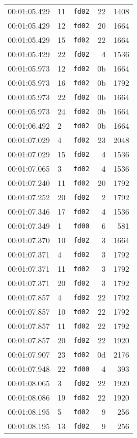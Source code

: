 \documentclass{article}
\begin{document}
\begin{longtable}{lllrr}
00:01:05.429 & 11 & \texttt{fd02} & 22 & 1408 \\
00:01:05.429 & 12 & \texttt{fd02} & 20 & 1664 \\
00:01:05.429 & 15 & \texttt{fd02} & 22 & 1664 \\
00:01:05.429 & 22 & \texttt{fd02} & 4 & 1536 \\
00:01:05.973 & 12 & \texttt{fd02} & 0b & 1664 \\
00:01:05.973 & 16 & \texttt{fd02} & 0b & 1792 \\
00:01:05.973 & 22 & \texttt{fd02} & 0b & 1664 \\
00:01:05.973 & 24 & \texttt{fd02} & 0b & 1664 \\
00:01:06.492 & 2 & \texttt{fd02} & 0b & 1664 \\
00:01:07.029 & 4 & \texttt{fd02} & 23 & 2048 \\
00:01:07.029 & 15 & \texttt{fd02} & 4 & 1536 \\
00:01:07.065 & 3 & \texttt{fd02} & 4 & 1536 \\
00:01:07.240 & 11 & \texttt{fd02} & 20 & 1792 \\
00:01:07.252 & 20 & \texttt{fd02} & 2 & 1792 \\
00:01:07.346 & 17 & \texttt{fd02} & 4 & 1536 \\
00:01:07.349 & 1 & \texttt{fd00} & 6 & 581 \\
00:01:07.370 & 10 & \texttt{fd02} & 3 & 1664 \\
00:01:07.371 & 4 & \texttt{fd02} & 3 & 1792 \\
00:01:07.371 & 11 & \texttt{fd02} & 3 & 1792 \\
00:01:07.371 & 20 & \texttt{fd02} & 3 & 1792 \\
00:01:07.857 & 4 & \texttt{fd02} & 22 & 1792 \\
00:01:07.857 & 10 & \texttt{fd02} & 22 & 1792 \\
00:01:07.857 & 11 & \texttt{fd02} & 22 & 1792 \\
00:01:07.857 & 20 & \texttt{fd02} & 22 & 1920 \\
00:01:07.907 & 23 & \texttt{fd02} & 0d & 2176 \\
00:01:07.948 & 22 & \texttt{fd00} & 4 & 393 \\
00:01:08.065 & 3 & \texttt{fd02} & 22 & 1920 \\
00:01:08.086 & 19 & \texttt{fd02} & 22 & 1920 \\
00:01:08.195 & 5 & \texttt{fd02} & 9 & 256 \\
00:01:08.195 & 13 & \texttt{fd02} & 9 & 256 \\

\end{longtable}
\end{document}
